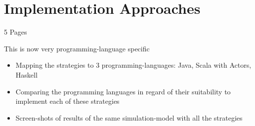 \section{Implementation Approaches}
5 Pages

This is now very programming-language specific

\begin{itemize}
	\item Mapping the strategies to 3 programming-languages: Java, Scala with Actors, Haskell
	\item Comparing the programming languages in regard of their suitability to implement each of these strategies
	\item Screen-shots of results of the same simulation-model with all the strategies
\end{itemize}
